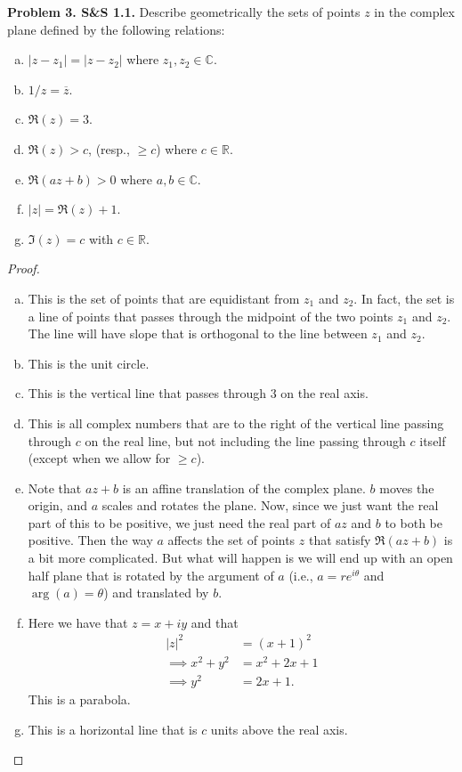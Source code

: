 \documentclass[leqno]{article}
\theoremstyle{nonumberplain}
\newtheorem{proof}{Proof}
\newcommand{\R}{\mathbb{R}}
\newcommand{\C}{\mathbb{C}}
\begin{document}
\vspace*{1cm}

\noindent\textbf{Problem 3. S\&S 1.1.} Describe geometrically the sets of points $z$ in the complex plane defined by the following relations:
\begin{enumerate}[(a)]
\item $|z-z_1|=|z-z_2|$ where $z_1,z_2 \in \C$.
\item $1/z=\overline{z}$.
\item $\Re(z)=3$.
\item $\Re(z)>c$, (resp., $\geq c$) where $c\in \R$.
\item $\Re(az+b)>0$ where $a,b\in \C$.
\item $|z|=\Re(z)+1$.
\item $\Im (z) = c$ with $c\in \R$.
\end{enumerate}


\begin{proof}~
\begin{enumerate}[(a)]
\item This is the set of points that are equidistant from $z_1$ and $z_2$.  In fact, the set is a line of points that passes through the midpoint of the two points $z_1$ and $z_2$.  The line will have slope that is orthogonal to the line between $z_1$ and $z_2$.
\item This is the unit circle.
\item This is the vertical line that passes through $3$ on the real axis.
\item This is all complex numbers that are to the right of the vertical line passing through $c$ on the real line, but not including the line passing through $c$ itself (except when we allow for $\geq c$).
\item Note that $az+b$ is an affine translation of the complex plane.  $b$ moves the origin, and $a$ scales and rotates the plane.  Now, since we just want the real part of this to be positive, we just need the real part of $az$ and $b$ to both be positive.  Then the way $a$ affects the set of points $z$ that satisfy $\Re(az+b)$ is a bit more complicated.  But what will happen is we will end up with an open half plane that is rotated by the argument of $a$ (i.e., $a=re^{i\theta}$ and $\arg(a)=\theta$) and translated by $b$.
\item Here we have that $z=x+iy$ and that
\begin{align*}
|z|^2&=(x+1)^2\\
\implies x^2+y^2&=x^2+2x+1\\
\implies y^2&=2x+1.
\end{align*}
This is a parabola.
\item This is a horizontal line that is $c$ units above the real axis.
\end{enumerate}
\end{proof}
\end{document}
